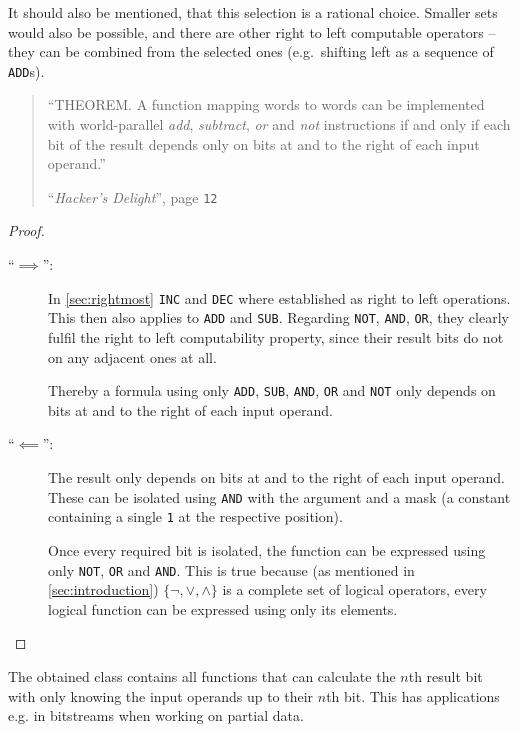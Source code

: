 It should also be mentioned, that this selection is a rational choice.
Smaller sets would also be possible,
and there are other right to left computable operators
-- they can be combined from the selected ones
(e.g.~shifting left as a sequence of \lstinline$ADD$s).

\begin{quote}
``THEOREM. A function mapping words to words can be implemented
with world-parallel \emph{add}, \emph{subtract}, \emph{or} and \emph{not}
instructions if and only if each bit of the result
depends only on bits at and to the right of each input operand.''
\par\hfill ``\emph{Hacker's Delight}'',
page \texttt{12} \cite{Warren:2012:HD:2462741}
\end{quote}

\begin{proof}~
\begin{description}
\item[``$\implies$'':]
In \autoref{sec:rightmost} \lstinline$INC$ and \lstinline$DEC$
where established as right to left operations.
This then also applies to \lstinline$ADD$ and \lstinline$SUB$.
Regarding \lstinline$NOT$, \lstinline$AND$, \lstinline$OR$,
they clearly fulfil the right to left computability property,
since their result bits do not on any adjacent ones at all.

Thereby a formula using only
\lstinline$ADD$, \lstinline$SUB$, \lstinline$AND$,
\lstinline$OR$ and \lstinline$NOT$
only depends on bits at and to the right of each input operand.

\item[``$\impliedby$'':]
The result only depends on bits at and to the right of each input operand.
These can be isolated using \lstinline$AND$ with the argument and a mask
(a constant containing a single \lstinline$1$ at the respective position).

Once every required bit is isolated, the function can be expressed
using only \lstinline$NOT$, \lstinline$OR$ and \lstinline$AND$.
This is true because (as mentioned in \autoref{sec:introduction})
$\{\lnot, \lor, \land\}$ is a complete set of logical operators,
every logical function can be expressed using only its elements.
\end{description}
\end{proof}

The obtained class contains all functions
that can calculate the $n$th result bit
with only knowing the input operands up to their $n$th bit.
This has applications e.g. in bitstreams when working on partial data.
